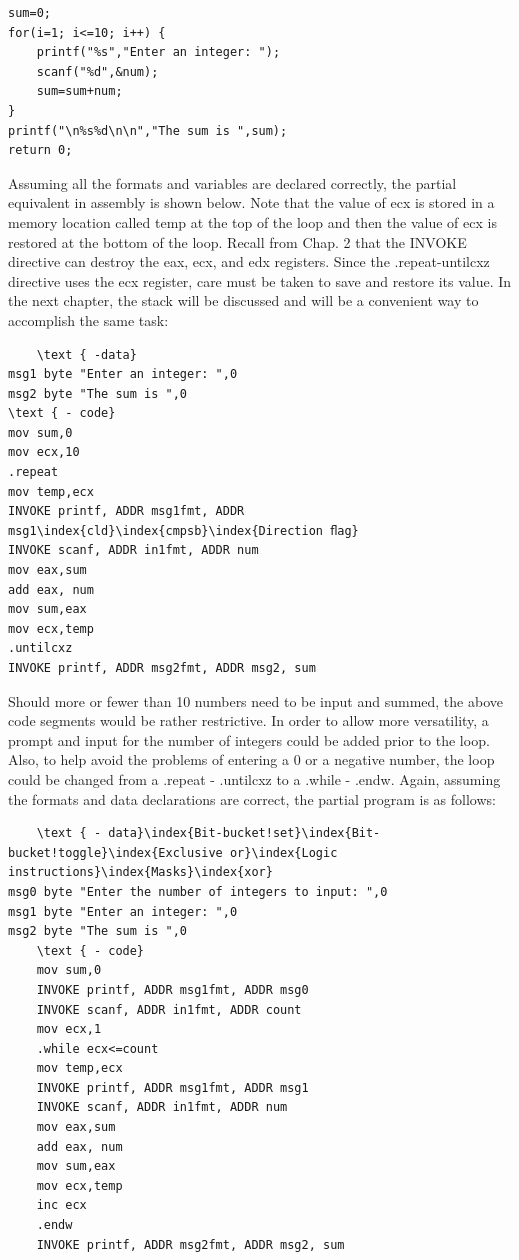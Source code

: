 \documentclass[10pt]{book}
\begin{document}
\begin{verbatim}
sum=0;
for(i=1; i<=10; i++) {
    printf("%s","Enter an integer: ");
    scanf("%d",&num);
    sum=sum+num;
}
printf("\n%s%d\n\n","The sum is ",sum);
return 0;
\end{verbatim}

Assuming all the formats and variables are declared correctly, the partial equivalent in assembly is shown below. Note that the value of ecx is stored in a memory location called temp at the top of the loop and then the value of ecx is restored at the bottom of the loop. Recall from Chap. 2 that the INVOKE directive can destroy the eax, ecx, and edx registers. Since the .repeat-untilcxz directive uses the ecx register, care must be taken to save and restore its value. In the next chapter, the stack will be discussed and will be a convenient way to accomplish the same task:

\begin{verbatim}
    \text { -data}
msg1 byte "Enter an integer: ",0
msg2 byte "The sum is ",0
\text { - code}
mov sum,0
mov ecx,10
.repeat
mov temp,ecx
INVOKE printf, ADDR msg1fmt, ADDR msg1\index{cld}\index{cmpsb}\index{Direction ﬂag}
INVOKE scanf, ADDR in1fmt, ADDR num
mov eax,sum
add eax, num
mov sum,eax
mov ecx,temp
.untilcxz
INVOKE printf, ADDR msg2fmt, ADDR msg2, sum
\end{verbatim}

Should more or fewer than 10 numbers need to be input and summed, the above code segments would be rather restrictive. In order to allow more versatility, a prompt and input for the number of integers could be added prior to the loop. Also, to help avoid the problems of entering a 0 or a negative number, the loop could be changed from a .repeat - .untilcxz to a .while - .endw. Again, assuming the formats and data declarations are correct, the partial program is as follows:

\begin{verbatim}
    \text { - data}\index{Bit-bucket!set}\index{Bit-bucket!toggle}\index{Exclusive or}\index{Logic instructions}\index{Masks}\index{xor}
msg0 byte "Enter the number of integers to input: ",0
msg1 byte "Enter an integer: ",0
msg2 byte "The sum is ",0
    \text { - code}
    mov sum,0
    INVOKE printf, ADDR msg1fmt, ADDR msg0
    INVOKE scanf, ADDR in1fmt, ADDR count
    mov ecx,1
    .while ecx<=count
    mov temp,ecx
    INVOKE printf, ADDR msg1fmt, ADDR msg1
    INVOKE scanf, ADDR in1fmt, ADDR num
    mov eax,sum
    add eax, num
    mov sum,eax
    mov ecx,temp
    inc ecx
    .endw
    INVOKE printf, ADDR msg2fmt, ADDR msg2, sum
\end{verbatim}
\end{document}
